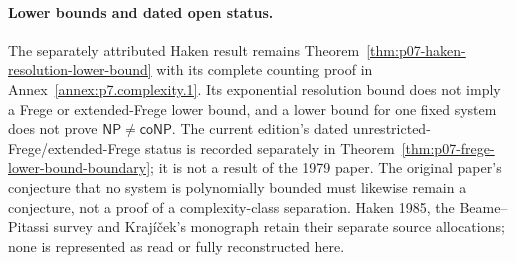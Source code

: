 \paragraph{Lower bounds and dated open status.}
The separately attributed Haken result remains
Theorem~\ref{thm:p07-haken-resolution-lower-bound} with its
complete counting proof in Annex~\ref{annex:p7.complexity.1}. Its exponential resolution bound does
not imply a Frege or extended-Frege lower bound, and a lower bound for
one fixed system does not prove \(\mathsf{NP}\ne\mathsf{coNP}\).
The current edition's dated unrestricted-Frege/extended-Frege status
is recorded separately in
Theorem~\ref{thm:p07-frege-lower-bound-boundary}; it is not a result
of the 1979 paper. The original paper's conjecture that no system
is polynomially bounded must likewise remain a conjecture, not a
proof of a complexity-class separation. Haken 1985, the Beame--Pitassi
survey and Kraj\'i\v{c}ek's monograph retain their separate source
allocations; none is represented as read or fully reconstructed here.
